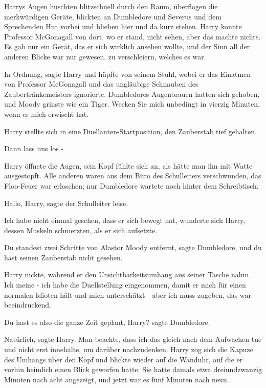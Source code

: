Harrys Augen huschten blitzschnell durch den Raum, überflogen die merkwürdigen
Geräte, blickten an Dumbledore und Severus und dem Sprechenden Hut vorbei und
blieben hier und da kurz stehen. Harry konnte Professor McGonagall von dort, wo
er stand, nicht sehen, aber das machte nichts. Es gab nur ein Gerät, das er sich
wirklich ansehen wollte, und der Sinn all der anderen Blicke war nur gewesen, zu
verschleiern, welches es war.

\glqq In Ordnung\grqq{}, sagte Harry und hüpfte von seinem Stuhl, wobei er das
Einatmen von Professor McGonagall und das ungläubige Schnauben des
Zaubertränkemeisters ignorierte. Dumbledores Augenbrauen hatten sich gehoben,
und Moody grinste wie ein Tiger. \glqq Wecken Sie mich unbedingt in vierzig
Minuten, wenn er mich erwischt hat.\grqq{}

Harry stellte sich in eine Duellanten-Startposition, den Zauberstab tief
gehalten.

\glqq Dann lass uns los -\grqq{}

Harry öffnete die Augen, sein Kopf fühlte sich an, als hätte man ihn mit Watte
ausgestopft. Alle anderen waren aus dem Büro des Schulleiters verschwunden, das
Floo-Feuer war erloschen; nur Dumbledore wartete noch hinter dem Schreibtisch.

\glqq Hallo, Harry\grqq{}, sagte der Schulleiter leise.

\glqq Ich habe nicht einmal gesehen, dass er sich bewegt hat\grqq{}, wunderte
sich Harry, dessen Muskeln schmerzten, als er sich aufsetzte.

\glqq Du standest zwei Schritte von Alastor Moody entfernt\grqq{}, sagte
Dumbledore, \glqq und du hast seinen Zauberstab nicht gesehen.\grqq{}

Harry nickte, während er den Unsichtbarkeitsumhang aus seiner Tasche nahm. \glqq
Ich meine - ich habe die Duellstellung eingenommen, damit er mich für einen
normalen Idioten hält und mich unterschätzt - aber ich muss zugeben, das war
beeindruckend.\grqq{}

\glqq Du hast es also die ganze Zeit geplant, Harry?\grqq{} sagte Dumbledore.

\glqq Natürlich\grqq{}, sagte Harry. \glqq Man beachte, dass ich das gleich nach
dem Aufwachen tue und nicht erst innehalte, um darüber nachzudenken.\grqq{}
Harry zog sich die Kapuze des Umhangs über den Kopf und blickte wieder auf die
Wanduhr, auf die er vorhin heimlich einen Blick geworfen hatte. Sie hatte damals
etwa dreiundzwanzig Minuten nach acht angezeigt, und jetzt war es fünf Minuten
nach neun...


